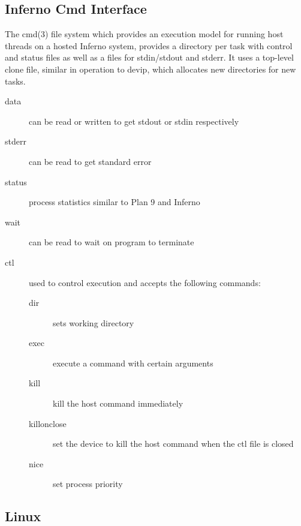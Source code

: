 \documentclass{sig-alternate}
\begin{document}
\subsection*{Inferno Cmd Interface}

The cmd(3) file system which provides an execution model for running
host threads on a hosted Inferno system, provides a directory per task
with control and status files as well as a files for stdin/stdout and
stderr.  It uses a top-level clone file, similar in operation to devip, 
which allocates new directories for new tasks.

\begin{description}
\item[data] can be read or written to get stdout or stdin respectively
\item[stderr] can be read to get standard error
\item[status] process statistics similar to Plan 9 and Inferno
\item[wait] can be read to wait on program to terminate
\item[ctl] used to control execution and accepts the following commands:
\begin{description}
\item[dir] sets working directory
\item[exec] execute a command with certain arguments
\item[kill] kill the host command immediately
\item[killonclose] set the device to kill the host command when the ctl file is closed
\item[nice] set process priority
\end{description}
\end{description}

\subsection*{Linux}
\end{document}
